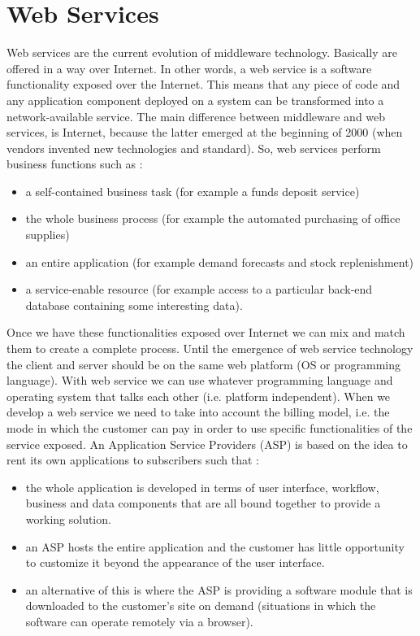 \documentclass[11pt]{article}
\begin{document}
\section{Web Services}
Web services are the current evolution of middleware technology. Basically are offered in a way over Internet. In other words, a web service is a software functionality exposed over the Internet. This means that any piece of code and any application component deployed on a system can be transformed into a network-available service. The main difference between middleware and web services, is Internet, because the latter emerged at the beginning of 2000 (when vendors invented new technologies and standard). So, web services perform business functions such as :
\begin{itemize}
\item a self-contained business task (for example a funds deposit service)
\item the whole business process (for example the automated purchasing of office supplies)
\item an entire application (for example demand forecasts and stock replenishment)
\item a service-enable resource (for example access to a particular back-end database containing some interesting data).
\end{itemize}
Once we have these functionalities exposed over Internet we can mix and match them to create a complete process. Until the emergence of web service technology the client and server should be on the same web platform (OS or programming language). With web service we can use whatever programming language and operating system that talks each other (i.e. platform independent). When we develop a web service we need to take into account the billing model, i.e. the mode in which the customer can pay in order to use specific functionalities of the service exposed. An Application Service Providers (ASP) is based on the idea to rent its own applications to subscribers such that :
\begin{itemize}
\item the whole application is developed in terms of user interface, workflow, business and data components that are all bound together to provide a working solution.
\item an ASP hosts the entire application and the customer has little opportunity to customize it beyond the appearance of the user interface.
\item an alternative of this is where the ASP is providing a software module that is downloaded to the customer's site on demand (situations in which the software can operate remotely via a browser).
\end{itemize}
\end{document}

